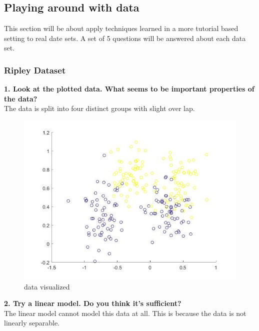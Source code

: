 \documentclass[11pt,oneside,a4paper]{article}
\begin{document}
\subsection{Playing around with data}

This section will be about apply techniques learned in a more tutorial based setting to real date sets. A set of 5 questions will be answered about each data set.

\subsubsection{Ripley Dataset}


\textbf{1. Look at the plotted data. What seems to be important properties of the data?}\\

The data is split into four distinct groups with slight over lap. 
\begin{figure}[H]
	\centering
	\includegraphics[scale=0.4]{../Figures/ripley_vis}
	\caption{data visualized}
\end{figure}

\textbf{2. Try a linear model. Do you think it’s sufficient?}\\
The linear model cannot model this data at all. This is because the data is not linearly separable. 
\end{document}
